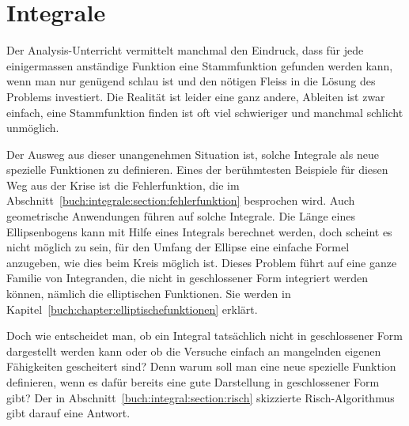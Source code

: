 %
%
%
\chapter{Integrale
\label{buch:chapter:integral}}
Der Analysis-Unterricht vermittelt manchmal den Eindruck, dass
für jede einigermassen anständige Funktion eine Stammfunktion
gefunden werden kann, wenn man nur genügend schlau ist und den 
nötigen Fleiss in die Lösung des Problems investiert.
Die Realität ist leider eine ganz andere, Ableiten ist zwar einfach,
eine Stammfunktion finden ist oft viel schwieriger und manchmal schlicht
unmöglich.

Der Ausweg aus dieser unangenehmen Situation ist, solche Integrale
als neue spezielle Funktionen zu definieren.
Eines der berühmtesten Beispiele für diesen Weg aus der Krise ist die
Fehlerfunktion, die im Abschnitt~\ref{buch:integrale:section:fehlerfunktion}
besprochen wird.
Auch geometrische Anwendungen führen auf solche Integrale.
Die Länge eines Ellipsenbogens kann mit Hilfe eines Integrals
berechnet werden, doch scheint es nicht möglich zu sein, für den
Umfang der Ellipse eine einfache Formel anzugeben, wie dies beim
Kreis möglich ist.
Dieses Problem führt auf eine ganze Familie von Integranden, die nicht in
geschlossener Form integriert werden können, nämlich die elliptischen
Funktionen.
Sie werden in Kapitel~\ref{buch:chapter:elliptischefunktionen} erklärt.

Doch wie entscheidet man, ob ein Integral tatsächlich nicht in geschlossener
Form dargestellt werden kann oder ob die Versuche einfach an mangelnden
eigenen Fähigkeiten gescheitert sind?
Denn warum soll man eine neue spezielle Funktion definieren, wenn es
dafür bereits eine gute Darstellung in geschlossener Form gibt?
Der in Abschnitt~\ref{buch:integral:section:risch} skizzierte
Risch-Algorithmus gibt darauf eine Antwort.








